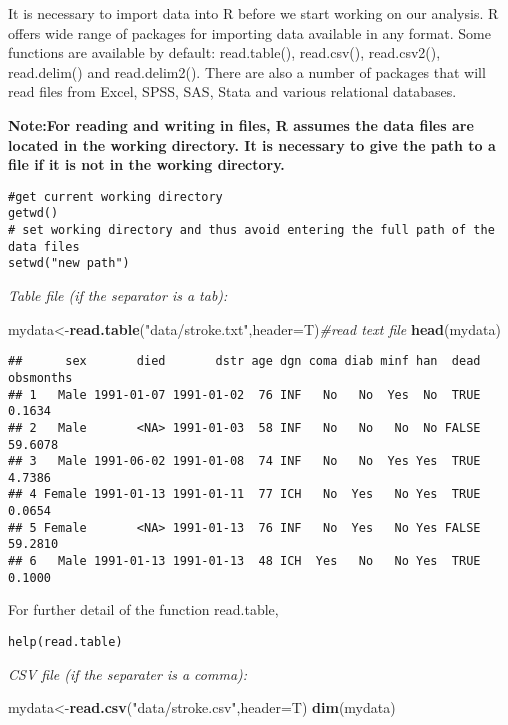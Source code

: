 \documentclass[]{book}
\newenvironment{Shaded}{\begin{snugshade}}{\end{snugshade}}
\newcommand{\KeywordTok}[1]{\textcolor[rgb]{0.13,0.29,0.53}{\textbf{#1}}}
\newcommand{\DataTypeTok}[1]{\textcolor[rgb]{0.13,0.29,0.53}{#1}}
\newcommand{\StringTok}[1]{\textcolor[rgb]{0.31,0.60,0.02}{#1}}
\newcommand{\CommentTok}[1]{\textcolor[rgb]{0.56,0.35,0.01}{\textit{#1}}}
\newcommand{\NormalTok}[1]{#1}
\theoremstyle{definition}
\theoremstyle{definition}
\theoremstyle{definition}
\theoremstyle{remark}
\begin{document}
It is necessary to import data into R before we start working on our
analysis. R offers wide range of packages for importing data available
in any format. Some functions are available by default: read.table(),
read.csv(), read.csv2(), read.delim() and read.delim2(). There are also
a number of packages that will read files from Excel, SPSS, SAS, Stata
and various relational databases.

\textbf{Note:For reading and writing in files, R assumes the data files
are located in the working directory. It is necessary to give the path
to a file if it is not in the working directory.}

\begin{verbatim}
#get current working directory
getwd()
# set working directory and thus avoid entering the full path of the data files
setwd("new path")  
\end{verbatim}

\emph{Table file (if the separator is a tab):}

\begin{Shaded}
\begin{Highlighting}[]
\NormalTok{mydata<-}\KeywordTok{read.table}\NormalTok{(}\StringTok{"data/stroke.txt"}\NormalTok{,}\DataTypeTok{header=}\NormalTok{T)}\CommentTok{#read text file}
\KeywordTok{head}\NormalTok{(mydata)}
\end{Highlighting}
\end{Shaded}

\begin{verbatim}
##      sex       died       dstr age dgn coma diab minf han  dead obsmonths
## 1   Male 1991-01-07 1991-01-02  76 INF   No   No  Yes  No  TRUE    0.1634
## 2   Male       <NA> 1991-01-03  58 INF   No   No   No  No FALSE   59.6078
## 3   Male 1991-06-02 1991-01-08  74 INF   No   No  Yes Yes  TRUE    4.7386
## 4 Female 1991-01-13 1991-01-11  77 ICH   No  Yes   No Yes  TRUE    0.0654
## 5 Female       <NA> 1991-01-13  76 INF   No  Yes   No Yes FALSE   59.2810
## 6   Male 1991-01-13 1991-01-13  48 ICH  Yes   No   No Yes  TRUE    0.1000
\end{verbatim}

For further detail of the function read.table,

\begin{verbatim}
help(read.table)
\end{verbatim}

\emph{CSV file (if the separater is a comma):}

\begin{Shaded}
\begin{Highlighting}[]
\NormalTok{mydata<-}\KeywordTok{read.csv}\NormalTok{(}\StringTok{"data/stroke.csv"}\NormalTok{,}\DataTypeTok{header=}\NormalTok{T)}
\KeywordTok{dim}\NormalTok{(mydata)}
\end{Highlighting}
\end{Shaded}
\end{document}
